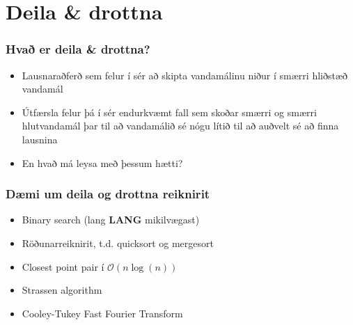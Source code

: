 \documentclass{beamer}
\begin{document}
\section[Deila \& Drottna]{Deila \& drottna}

\begin{frame}
\frametitle{Hvað er deila \& drottna?}

\begin{itemize}

\item<1-> Lausnaraðferð sem felur í sér að skipta vandamálinu niður í smærri hliðstæð vandamál

\item<2->  Útfærsla felur þá í sér endurkvæmt fall sem skoðar smærri og smærri hlutvandamál þar til að vandamálið sé nógu lítið til að auðvelt sé að finna lausnina

\item<3-> En hvað má leysa með þessum hætti?

\end{itemize}

\end{frame}

\begin{frame}
\frametitle{Dæmi um deila og drottna reiknirit}

\begin{itemize}

\item<1-> Binary search (lang \textbf{LANG} mikilvægast)

\item<2-> Röðunarreiknirit, t.d. quicksort og mergesort

\item<3-> Closest point pair í $\mathcal{O}(n\log(n))$

\item<4-> Strassen algorithm

\item<5-> Cooley-Tukey Fast Fourier Transform

\end{itemize}

\end{frame}
\end{document}
